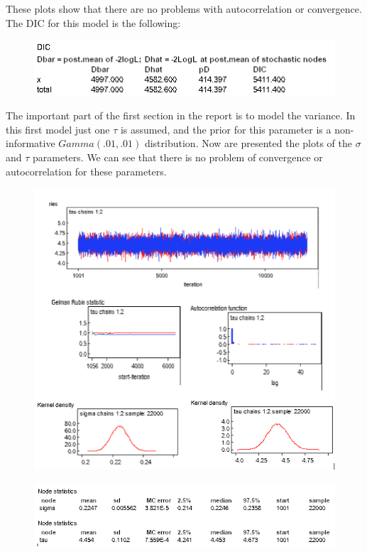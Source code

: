 \documentclass{article}
\begin{document}
These plots show that there are no problems with autocorrelation or convergence. The DIC for this model is the following:

\begin{figure}[ht!]
\centering
\includegraphics[width=12cm]{figures/model1_DIC.png}
\end{figure}
\newpage

The important part of the first section in the report is to model the variance. In this first model just one $\tau$ is assumed, and the prior for this parameter is a non-informative $Gamma(.01,.01)$ distribution. Now are presented the plots of the $\sigma$ and $\tau$ parameters. We can see that there is no problem of convergence or autocorrelation for these parameters.


\begin{figure}[ht!]
\centering
\includegraphics[width=14cm]{figures/model1_sigma.png}
\end{figure}

\begin{figure}[ht!]
\centering
\includegraphics[width=14cm]{figures/model1_sigma2.png}
\end{figure}
\end{document}
